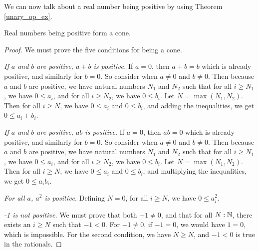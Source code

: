 \documentclass[../../math.tex]{subfiles}
\begin{document}
We can now talk about a real number being positive by using Theorem
\ref{unary_op_ex}.

\begin{instance}
    Real numbers being positive form a cone.
\end{instance}
\begin{proof}
    We must prove the five conditions for being a cone.

    \textit{If $a$ and $b$ are positive, $a + b$ is positive.}  If $a = 0$, then
    $a + b = b$ which is already positive, and similarly for $b = 0$.  So
    consider when $a \neq 0$ and $b \neq 0$.  Then because $a$ and $b$ are
    positive, we have natural numbers $N_1$ and $N_2$ such that for all $i \geq
    N_1$, we have $0 \leq a_i$, and for all $i \geq N_2$, we have $0 \leq b_i$.
    Let $N = \max(N_1, N_2)$.  Then for all $i \geq N$, we have $0 \leq a_i$ and
    $0 \leq b_i$, and adding the inequalities, we get $0 \leq a_i + b_i$.


    \textit{If $a$ and $b$ are positive, $ab$ is positive.}  If $a = 0$, then
    $ab = 0$ which is already positive, and similarly for $b = 0$.  So consider
    when $a \neq 0$ and $b \neq 0$.  Then because $a$ and $b$ are positive, we
    have natural numbers $N_1$ and $N_2$ such that for all $i \geq N_1$, we have
    $0 \leq a_i$, and for all $i \geq N_2$, we have $0 \leq b_i$.  Let $N =
    \max(N_1, N_2)$.  Then for all $i \geq N$, we have $0 \leq a_i$ and $0 \leq
    b_i$, and multiplying the inequalities, we get $0 \leq a_i b_i$.

    \textit{For all $a$, $a^2$ is positive.}  Defining $N = 0$, for all $i \geq
    N$, we have $0 \leq a_i^2$.

    \textit{-1 is not positive.}  We must prove that both $-1 \neq 0$, and that
    for all $N : \mathbb{N}$, there exists an $i \geq N$ such that $-1 < 0$.  For $-1
    \neq 0$, if $-1 = 0$, we would have $1 = 0$, which is impossible.  For the
    second condition, we have $N \geq N$, and $-1 < 0$ is true in the rationals.


\end{proof}
\end{document}
